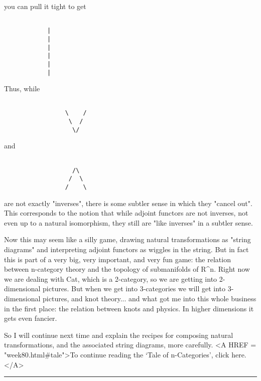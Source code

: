 you can pull it tight to get


\begin{verbatim}

            |
            |
            |
            |
            |
            |

\end{verbatim}
    
Thus, while


\begin{verbatim}

                 \    /
                  \  / 
                   \/

\end{verbatim}
    
and


\begin{verbatim}

                   /\
                  /  \
                 /    \

\end{verbatim}
    
are not exactly "inverses", there is some subtler sense in which they
"cancel out".  This corresponds to the notion that while adjoint functors
are not inverses, not even up to a natural isomorphism, they still are
"like inverses" in a subtler sense.


Now this may seem like a silly game, drawing natural transformations as
"string diagrams" and interpreting adjoint functors as wiggles
in the string.  But in fact this is part of a very big, very important,
and very fun game: the relation between n-category theory and the
topology of submanifolds of R^{n}.  Right now we are dealing
with Cat, which is a 2-category, so we are getting into 2-dimensional
pictures.  But when we get into 3-categories we will get into
3-dimensional pictures, and knot theory... and what got me into this
whole business in the first place: the relation between knots and
physics.  In higher dimensions it gets even fancier.

So I will continue next time and explain the recipes for composing
natural transformations, and the associated string diagrams, more
carefully. 
<A HREF = "week80.html#tale">To continue reading the `Tale of
n-Categories', click here.</A>



\par\noindent\rule{\textwidth}{0.4pt}
